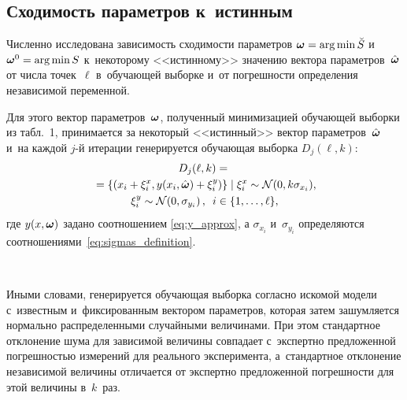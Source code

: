 \begin{multicols}{2}
\subsection{Сходимость параметров к~истинным}

Численно исследована зависимость сходимости параметров $\bomega \hm= \arg \min 
\breve{S}$
и~$\bomega^0 \hm= \arg \min S$ к~некоторому <<истинному>> значению вектора 
па\-ра\-мет\-ров~$\hat{\boldsymbol{\omega}}$ от числа точек~$\ell$ в~обучающей выборке и~от погрешности 
определения независимой переменной.

Для этого вектор параметров~$\boldsymbol{\omega}$, полученный минимизацией обучающей выборки 
из табл.~1, принимается за некоторый <<истинный>> вектор 
параметров~$\hat{\boldsymbol{\omega}}$
и~на каждой $j$-й итерации генерируется обучающая выборка $D_j(\ell, k)$:
\begin{multline*}
  D_j(\ell, k) = {}\\
  {}=\left\{ (x_i + \xi^x_i, y(x_i, \hat{\boldsymbol{\omega}}) + \xi^y_i) \right\} \mid 
\xi^x_i \sim \mathcal{N}(0, k \sigma_{x_i}),\\
\xi^y_i \sim \mathcal{N}(0, 
\sigma_{y_i})\,,\enskip i \in \{ 1, \dots, \ell \},
\end{multline*}
где $y(x, \boldsymbol{\omega})$ задано соотношением \eqref{eq:y_approx}, а $\sigma_{x_i}$ 
и~$\sigma_{y_i}$
определяются соотношениями~\eqref{eq:sigmas_definition}.

\begin{figure*}[b] %
\vspace*{3pt}
\begin{center}
\mbox{%
\epsfxsize=162.35mm
}
\end{center}
\vspace*{-9pt}
  \label{fig:comparison_0.2}
\end{figure*}

Иными словами, генерируется обучающая выборка согласно искомой модели 
с~известным и~фиксированным вектором параметров, которая затем зашумляется 
нормально распределенными случайными величинами. При этом стандартное отклонение
шума для зависимой величины совпадает с~экспертно предложенной погрешностью
измерений для реального эксперимента, а~стандартное отклонение независимой
величины отличается от экспертно предложенной погрешности для этой величины
в~$k$~раз.


\end{multicols}
